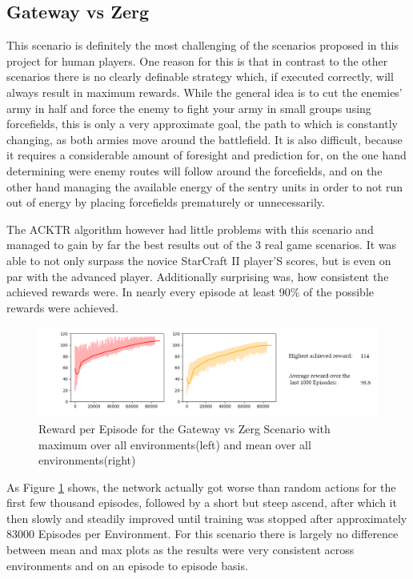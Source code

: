 \subsection{Gateway vs Zerg}
This scenario is definitely the most challenging of the scenarios proposed in this project for human players. One reason for this is that in contrast to the other scenarios there is no clearly definable strategy which, if executed correctly, will always result in maximum rewards. While the general idea is to cut the enemies' army in half and force the enemy to fight your army in small groups using forcefields, this is only a very approximate goal, the path to which is constantly changing, as both armies move around the battlefield. It is also difficult, because it requires a considerable amount of foresight and prediction for, on the one hand determining were enemy routes will follow around the forcefields, and on the other hand managing the available energy of the sentry units in order to not run out of energy by placing forcefields prematurely or unnecessarily. 

The ACKTR algorithm however had little problems with this scenario and managed to gain by far the best results out of the 3 real game scenarios. It was able to not only surpass the novice StarCraft II player'S scores, but is even on par with the advanced player. Additionally surprising was, how consistent the achieved rewards were. In nearly every episode at least 90\% of the possible rewards were achieved.

\begin{figure}[htb]
  \centering
      \includegraphics[width=1\textwidth]{Figures/plots/plot_gz_acktr.png}
  \caption{Reward per Episode for the Gateway vs Zerg Scenario with maximum over all environments(left) and mean over all environments(right)}
  \label{fig:gz_rew}
\end{figure}

As Figure \ref{fig:gz_rew} shows, the network actually got worse than random actions for the first few thousand episodes, followed by a short but steep ascend, after which it then slowly and steadily improved until training was stopped after approximately 83000 Episodes per Environment. For this scenario there is largely no difference between mean and max plots as the results were very consistent across environments and on an episode to episode basis.

